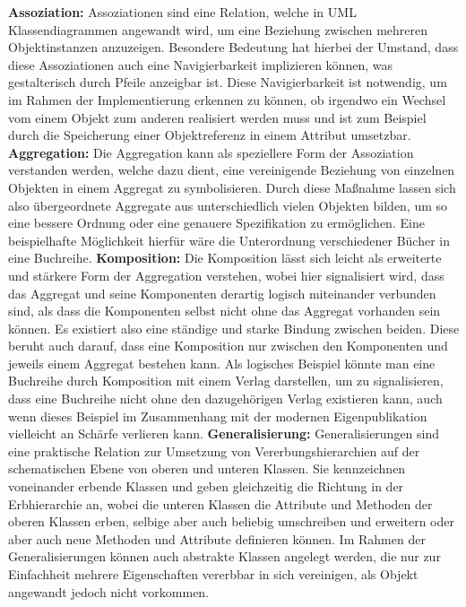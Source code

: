 \documentclass{swp1}
\begin{document}
\textbf{Assoziation:}\newline
Assoziationen sind eine Relation, welche in UML Klassendiagrammen angewandt wird, um eine Beziehung zwischen mehreren Objektinstanzen anzuzeigen.
Besondere Bedeutung hat hierbei der Umstand, dass diese Assoziationen auch eine Navigierbarkeit implizieren können, was gestalterisch durch Pfeile anzeigbar ist.\newline
Diese Navigierbarkeit ist notwendig, um im Rahmen der Implementierung erkennen zu können, ob irgendwo ein Wechsel vom einem Objekt zum anderen realisiert werden muss und ist zum Beispiel durch die Speicherung einer Objektreferenz in einem Attribut umsetzbar.\newline
\textbf{Aggregation:}\newline
Die Aggregation kann als speziellere Form der Assoziation verstanden werden, welche dazu dient, eine vereinigende Beziehung von einzelnen Objekten in einem Aggregat zu symbolisieren.
Durch diese Maßnahme lassen sich also übergeordnete Aggregate aus unterschiedlich vielen Objekten bilden, um so eine bessere Ordnung oder eine genauere Spezifikation zu ermöglichen.\newline
Eine beispielhafte Möglichkeit hierfür wäre die Unterordnung verschiedener Bücher in eine Buchreihe.\newline
\textbf{Komposition:}\newline
Die Komposition lässt sich leicht als erweiterte und stärkere Form der Aggregation verstehen, wobei hier signalisiert wird, dass das Aggregat und seine Komponenten derartig logisch miteinander verbunden sind, als dass die Komponenten selbst nicht ohne das Aggregat vorhanden sein können. Es existiert also eine ständige und starke Bindung zwischen beiden. Diese beruht auch darauf, dass eine Komposition nur zwischen den Komponenten und jeweils einem Aggregat bestehen kann.\newline
Als logisches Beispiel könnte man eine Buchreihe durch Komposition mit einem Verlag darstellen, um zu signalisieren, dass eine Buchreihe nicht ohne den dazugehörigen Verlag existieren kann, auch wenn dieses Beispiel im Zusammenhang mit der modernen Eigenpublikation vielleicht an Schärfe verlieren kann.\newline
\textbf{Generalisierung:}\newline
Generalisierungen sind eine praktische Relation zur Umsetzung von Vererbungshierarchien auf der schematischen Ebene von oberen und unteren Klassen. Sie kennzeichnen voneinander erbende Klassen und geben gleichzeitig die Richtung in der Erbhierarchie an, wobei die unteren Klassen die Attribute und Methoden der oberen Klassen erben, selbige aber auch beliebig umschreiben und erweitern oder aber auch neue Methoden und Attribute definieren können. Im Rahmen der Generalisierungen können auch abstrakte Klassen angelegt werden, die nur zur Einfachheit mehrere Eigenschaften vererbbar in sich vereinigen, als Objekt angewandt jedoch nicht vorkommen.\newline
\end{document}
